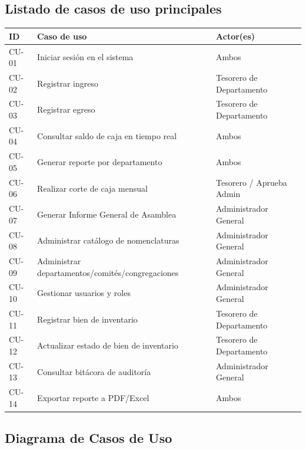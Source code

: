 \documentclass[11pt,a4paper]{article}
\begin{document}
	\subsection{Listado de casos de uso principales}
	\begin{table}[h!]
		\centering
		\renewcommand{\arraystretch}{1.1}
		\begin{tabularx}{\textwidth}{l X l}
			\toprule
			\textbf{ID} & \textbf{Caso de uso} & \textbf{Actor(es)} \\
			\midrule
			CU-01 & Iniciar sesión en el sistema & Ambos \\
			CU-02 & Registrar ingreso & Tesorero de Departamento \\
			CU-03 & Registrar egreso & Tesorero de Departamento \\
			CU-04 & Consultar saldo de caja en tiempo real & Ambos \\
			CU-05 & Generar reporte por departamento & Ambos \\
			CU-06 & Realizar corte de caja mensual & Tesorero / Aprueba Admin \\
			CU-07 & Generar Informe General de Asamblea & Administrador General \\
			CU-08 & Administrar catálogo de nomenclaturas & Administrador General \\
			CU-09 & Administrar departamentos/comités/congregaciones & Administrador General \\
			CU-10 & Gestionar usuarios y roles & Administrador General \\
			CU-11 & Registrar bien de inventario & Tesorero de Departamento \\
			CU-12 & Actualizar estado de bien de inventario & Tesorero de Departamento \\
			CU-13 & Consultar bitácora de auditoría & Administrador General \\
			CU-14 & Exportar reporte a PDF/Excel & Ambos \\
			\bottomrule
		\end{tabularx}
	\end{table}
	
	\subsection{Diagrama de Casos de Uso}
	
\end{document}
